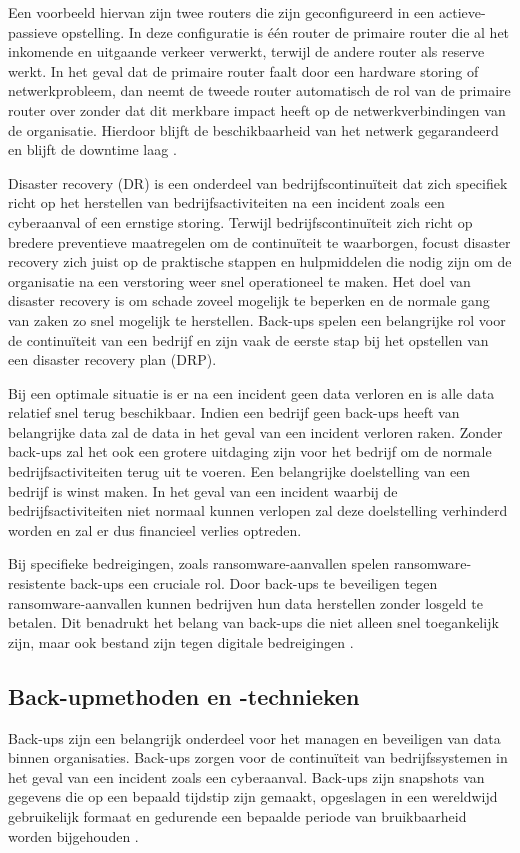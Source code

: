 Een voorbeeld hiervan zijn twee routers die zijn geconfigureerd in een actieve-passieve opstelling. In deze configuratie is één router de primaire router die al het inkomende en uitgaande verkeer verwerkt, terwijl de andere router als reserve werkt. In het geval dat de primaire router faalt door een hardware storing of netwerkprobleem, dan neemt de tweede router automatisch de rol van de primaire router over zonder dat dit merkbare impact heeft op de netwerkverbindingen van de organisatie. Hierdoor blijft de beschikbaarheid van het netwerk gegarandeerd en blijft de downtime laag \autocite{Zhu2015}. 

Disaster recovery (DR) is een onderdeel van bedrijfscontinuïteit dat zich specifiek richt op het herstellen van bedrijfsactiviteiten na een incident zoals een cyberaanval of een ernstige storing. Terwijl bedrijfscontinuïteit zich richt op bredere preventieve maatregelen om de continuïteit te waarborgen, focust disaster recovery zich juist op de praktische stappen en hulpmiddelen die nodig zijn om de organisatie na een verstoring weer snel operationeel te maken. Het doel van disaster recovery is om schade zoveel mogelijk te beperken en de normale gang van zaken zo snel mogelijk te herstellen. Back-ups spelen een belangrijke rol voor de continuïteit van een bedrijf en zijn vaak de eerste stap bij het opstellen van een disaster recovery plan (DRP). 

Bij een optimale situatie is er na een incident geen data verloren en is alle data relatief snel terug beschikbaar. Indien een bedrijf geen back-ups heeft van belangrijke data zal de data in het geval van een incident verloren raken. Zonder back-ups zal het ook een grotere uitdaging zijn voor het bedrijf om de normale bedrijfsactiviteiten terug uit te voeren. Een belangrijke doelstelling van een bedrijf is winst maken. In het geval van een incident waarbij de bedrijfsactiviteiten niet normaal kunnen verlopen zal deze doelstelling verhinderd worden en zal er dus financieel verlies optreden. 

Bij specifieke bedreigingen, zoals ransomware-aanvallen spelen ransomware-resistente back-ups een cruciale rol. Door back-ups te beveiligen tegen ransomware-aanvallen kunnen bedrijven hun data herstellen zonder losgeld te betalen. Dit benadrukt het belang van back-ups die niet alleen snel toegankelijk zijn, maar ook bestand zijn tegen digitale bedreigingen \autocite{Ghazi2013}.

\subsection{Back-upmethoden en -technieken}
Back-ups zijn een belangrijk onderdeel voor het managen en beveiligen van data binnen organisaties. Back-ups zorgen voor de continuïteit van bedrijfssystemen in het geval van een incident zoals een cyberaanval. Back-ups zijn snapshots van gegevens die op een bepaald tijdstip zijn gemaakt, opgeslagen in een wereldwijd gebruikelijk formaat en gedurende een bepaalde periode van bruikbaarheid worden bijgehouden \autocite{Nelson2011}. 

